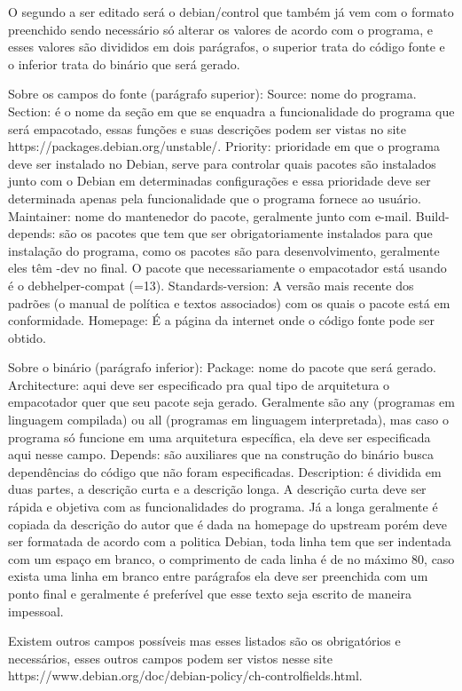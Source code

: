 O segundo a ser editado será o debian/control que também já vem com o formato preenchido sendo necessário só alterar os valores de acordo com o programa, e esses valores são divididos em dois parágrafos, o superior trata do código fonte e o inferior trata do binário que será gerado.

Sobre os campos do fonte (parágrafo superior):
Source: nome do programa.
Section: é o nome da seção em que se enquadra a funcionalidade do programa que será empacotado, essas funções e suas descrições podem ser vistas no site https://packages.debian.org/unstable/.
Priority: prioridade em que o programa deve ser instalado no Debian, serve para controlar quais pacotes são instalados junto com o Debian em determinadas configurações e essa prioridade deve ser determinada apenas pela funcionalidade que o programa fornece ao usuário.
Maintainer: nome do mantenedor do pacote, geralmente junto com e-mail.
Build-depends: são os pacotes que tem que ser obrigatoriamente instalados para que instalação do programa, como os pacotes são para desenvolvimento, geralmente eles têm -dev no final. O pacote que necessariamente o empacotador está usando é o debhelper-compat (=13).
Standards-version: A versão mais recente dos padrões (o manual de política e textos associados) com os quais o pacote está em conformidade. 
Homepage: É a página da internet onde o código fonte pode ser obtido.

Sobre o binário (parágrafo inferior):
Package: nome do pacote que será gerado.
Architecture: aqui deve ser especificado pra qual tipo de arquitetura o empacotador quer que seu pacote seja gerado. Geralmente são any (programas em linguagem compilada) ou all (programas em linguagem interpretada), mas caso o programa só funcione em uma arquitetura específica, ela deve ser especificada aqui nesse campo.
Depends: são auxiliares que na construção do binário busca dependências do código que não foram especificadas. 
Description: é dividida em duas partes, a descrição curta e a descrição longa.
A descrição curta deve ser rápida e objetiva com as funcionalidades do programa. Já a longa geralmente é copiada da descrição do autor que é dada na homepage do upstream porém deve ser formatada de acordo com a politica Debian, toda linha tem que ser indentada com um espaço em branco, o comprimento de cada linha é de no máximo 80, caso exista uma linha em branco entre parágrafos ela deve ser preenchida com um ponto final e geralmente é preferível que esse texto seja escrito de maneira impessoal.

Existem outros campos possíveis mas esses listados são os obrigatórios e necessários, esses outros campos podem ser vistos nesse site https://www.debian.org/doc/debian-policy/ch-controlfields.html. 

